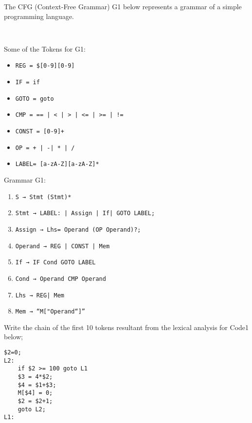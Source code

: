 \documentclass[docid=2020]{comp_test1}
\begin{document}
\setcounter{chapter}{2020}


The CFG (Context-Free Grammar) G1 below represents a grammar of a simple programming language.

~

\begin{minipage}[t]{0.44\textwidth}
    Some of the Tokens for G1:
    
    \begin{itemize}[wide, noitemsep, label={}]
        \item \texttt{REG = \$[0-9][0-9]}
        \item \texttt{IF = if}
        \item \texttt{GOTO = goto}
        \item \texttt{CMP = == | < | > | <= | >= | !=}
        \item \texttt{CONST = [0-9]+}
        \item \texttt{OP = + | -| * | /}
        \item \texttt{LABEL= [a-zA-Z][a-zA-Z]*}
    \end{itemize}
\end{minipage}
\begin{minipage}[t]{0.54\textwidth}
    Grammar G1:
    
    \begin{enumerate}
        \item \texttt{S → Stmt (Stmt)*}
        \item \texttt{Stmt → LABEL: | Assign | If| GOTO LABEL;}
        \item \texttt{Assign → Lhs= Operand (OP Operand)?;}
        \item \texttt{Operand → REG | CONST | Mem}
        \item \texttt{If → IF Cond GOTO LABEL}
        \item \texttt{Cond → Operand CMP Operand }
        \item \texttt{Lhs → REG| Mem}
        \item \texttt{Mem → “M["Operand“]”}
    \end{enumerate}
\end{minipage}

\question
Write the chain of the first 10 tokens resultant from the lexical analysis for Code1 below;

\begin{lstlisting}[caption=Code1]
    $2=0;
L2:
    if $2 >= 100 goto L1
    $3 = 4*$2;
    $4 = $1+$3;
    M[$4] = 0;
    $2 = $2+1;
    goto L2;
L1:
\end{lstlisting}
\end{document}
